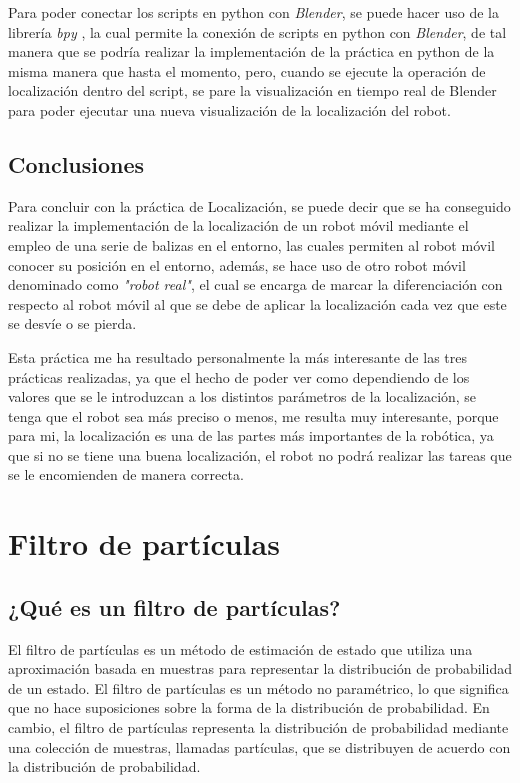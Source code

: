 \documentclass[11pt]{report}
\begin{document}
Para poder conectar los scripts en python con \emph{Blender}, se puede hacer uso de la librería \emph{bpy} \cite{6}, la cual permite la conexión de scripts en python con \emph{Blender}, de tal manera que se podría realizar la implementación de la práctica en python de la misma manera que hasta el momento, pero, cuando se ejecute la operación de localización dentro del script, se pare la visualización en tiempo real de Blender para poder ejecutar una nueva visualización de la localización del robot.

\section{Conclusiones}

Para concluir con la práctica de Localización, se puede decir que se ha conseguido realizar la implementación de la localización de un robot móvil mediante el empleo de una serie de balizas en el entorno, las cuales permiten al robot móvil conocer su posición en el entorno, además, se hace uso de otro robot móvil denominado como \emph{"robot real"}, el cual se encarga de marcar la diferenciación con respecto al robot móvil al que se debe de aplicar la localización cada vez que este se desvíe o se pierda. 

Esta práctica me ha resultado personalmente la más interesante de las tres prácticas realizadas, ya que el hecho de poder ver como dependiendo de los valores que se le introduzcan a los distintos parámetros de la localización, se tenga que el robot sea más preciso o menos, me resulta muy interesante, porque para mi, la localización es una de las partes más importantes de la robótica, ya que si no se tiene una buena localización, el robot no podrá realizar las tareas que se le encomienden de manera correcta.

\chapter{Filtro de partículas}

\section{¿Qué es un filtro de partículas?}

El filtro de partículas es un método de estimación de estado que utiliza una aproximación basada en muestras para representar la distribución de probabilidad de un estado. El filtro de partículas es un método no paramétrico, lo que significa que no hace suposiciones sobre la forma de la distribución de probabilidad. En cambio, el filtro de partículas representa la distribución de probabilidad mediante una colección de muestras, llamadas partículas, que se distribuyen de acuerdo con la distribución de probabilidad. 
\end{document}
